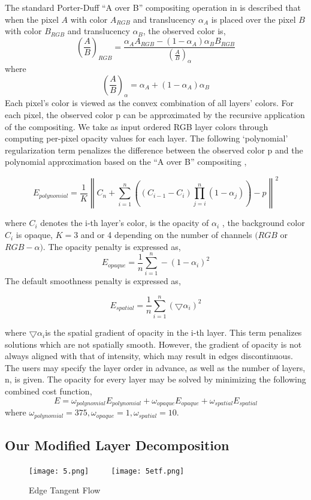The standard Porter-Duff “A over B” compositing operation in \cite{porter1984compositing} is described that when the pixel $A$ with color $A_{RGB}$ and translucency $\alpha_{A}$ is placed over the pixel $B$ with color $B_{RGB}$ and translucency $\alpha_{B}$, the observed color is, 
\[  \left ( \frac{A}{B} \right )_{RGB}=\frac{\alpha_{A}A_{RGB}-(1-\alpha_{A})\alpha_{B}B_{RGB}}{\left ( \frac{A}{B} \right )_{\alpha}} \]
where 
\[\left ( \frac{A}{B} \right )_{\alpha} = \alpha_{A}+(1-\alpha_{A})\alpha_{B} \] 
Each pixel’s color is viewed as the convex combination of all layers’ colors. For each pixel, the observed color p can be approximated by the recursive application of the compositing. We take as input ordered RGB layer colors through computing per-pixel opacity values for each layer. The following ‘polynomial’ regularization term penalizes the difference between the observed color p and the polynomial approximation based on the “A over B” compositing \cite{porter1984compositing},

\[E_{polynomial}=\frac{1}{K}\left \|    C_{n}+\sum_{i=1}^{n}  \left ( \left ( C_{i-1}-C_{i} \right ) \prod_{j=i}^{n}(1-\alpha_{j}) \right )-p  \right \|^{2}\]

where $C_{i}$ denotes the i-th layer’s color, is the opacity of $\alpha_{i}$ , the background color $C_{i}$ is opaque, $K=3$ and or 4 depending on the number of channels $(RGB$ or $RGB-\alpha)$. The opacity penalty is expressed as,
\[E_{opaque}=\frac{1}{n}\sum_{i=1}^n-(1-\alpha_{i})^2\]
The default smoothness penalty is expressed as,

\[E_{spatial}=\frac{1}{n}\sum_{i=1}^n( \bigtriangledown  \alpha_{i})^2\]

where $ \bigtriangledown  \alpha_{i}$is the spatial gradient of opacity in the i-th layer. This term penalizes solutions which are not spatially smooth. However, the gradient of opacity is not always aligned with that of intensity, which may result in edges discontinuous.
The users may specify the layer order in advance, as well as the number of layers, n, is given. The opacity for every layer may be solved by minimizing the following combined cost function,
\begin{equation}
E=\omega_{polynomial}E_{polynomial}+\omega_{opaque}E_{opaque}+\omega_{spatial}E_{spatial}
\label{eq:layer1}
\end{equation} 
where $\omega_{polynomial} = 375 ,\omega_{opaque}=1 , \omega_{spatial}=10$. 

\subsection{Our Modified Layer Decomposition}
\begin{figure}[H]
	\centering
	\texttt{[image: 5.png]}
	~~~~
	\texttt{[image: 5etf.png]}
	\caption{Edge Tangent Flow}
	\label{ETF}
\end{figure}

